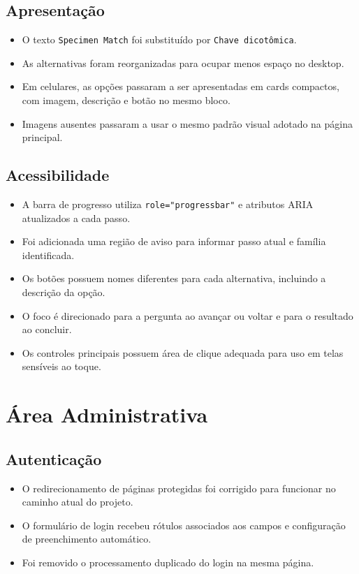 \documentclass[12pt,a4paper]{article}
\begin{document}
\subsection{Apresentação}

\begin{itemize}
  \item O texto \texttt{Specimen Match} foi substituído por \texttt{Chave dicotômica}.
  \item As alternativas foram reorganizadas para ocupar menos espaço no desktop.
  \item Em celulares, as opções passaram a ser apresentadas em cards compactos, com imagem, descrição e botão no mesmo bloco.
  \item Imagens ausentes passaram a usar o mesmo padrão visual adotado na página principal.
\end{itemize}

\subsection{Acessibilidade}

\begin{itemize}
  \item A barra de progresso utiliza \texttt{role="progressbar"} e atributos ARIA atualizados a cada passo.
  \item Foi adicionada uma região de aviso para informar passo atual e família identificada.
  \item Os botões possuem nomes diferentes para cada alternativa, incluindo a descrição da opção.
  \item O foco é direcionado para a pergunta ao avançar ou voltar e para o resultado ao concluir.
  \item Os controles principais possuem área de clique adequada para uso em telas sensíveis ao toque.
\end{itemize}

\section{Área Administrativa}

\subsection{Autenticação}

\begin{itemize}
  \item O redirecionamento de páginas protegidas foi corrigido para funcionar no caminho atual do projeto.
  \item O formulário de login recebeu rótulos associados aos campos e configuração de preenchimento automático.
  \item Foi removido o processamento duplicado do login na mesma página.
\end{itemize}
\end{document}
